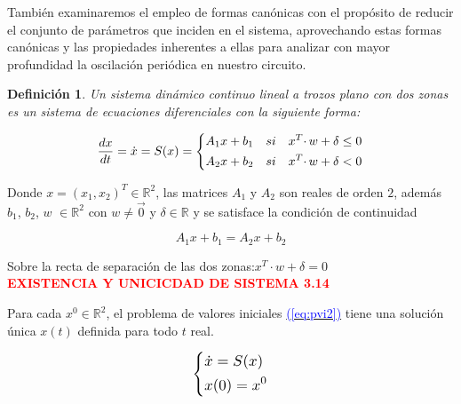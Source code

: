 \documentclass[12pt,a4paper]{report} %
\newtheorem{definicion}{Definición}[chapter]
\newtheorem{definicion}{Definición}[chapter] %
\newcommand{\eref}[1]{\hyperref[#1]{\textcolor{blue}{(\ref*{#1})}}}
\newcommand{\eref}[1]{\hyperref[#1]{\textcolor{blue}{\textit{(\ref*{#1})}}}}
\begin{document}
	\vspace{0.5cm}\noindent También examinaremos el empleo de formas canónicas con el propósito de reducir el conjunto de parámetros que inciden en el sistema, aprovechando estas formas canónicas y las propiedades inherentes a ellas para analizar con mayor profundidad la oscilación periódica en nuestro circuito.
	
	\begin{definicion}
		Un sistema dinámico continuo lineal a trozos plano con dos zonas es un sistema de ecuaciones diferenciales con la siguiente forma:
	\end{definicion}
	
	\begin{equation}
		\frac{dx}{dt}=\dot{x}=S(x)=
		\label{eq:biz1}
		\scalebox{1}{$\displaystyle
			\left\{
			\begin{aligned}
			 A_1x+b_1\quad si \quad x^T\cdotp w+\delta \leq 0 \\
			 A_2x+b_2\quad si \quad x^T\cdotp w+\delta < 0
			\end{aligned}
			\right.
			$}
	\end{equation}\smallskip
	
	\noindent Donde $x=(x_1,x_2)^T\in \mathbb{R}^2$, las matrices $A_1$ y $A_2$ son reales de orden $2$, además\\ $b_1$, $b_2$, $w$ $\in \mathbb{R}^2$ con $w\neq\vec{0}$ y $\delta \in \mathbb{R}$ y se satisface la condición de continuidad
	
	\begin{equation}
		A_1x+b_1=A_2x+b_2 
	\end{equation}\smallskip
	
	\noindent Sobre la recta de separación de las dos zonas:\quad $x^T\cdotp w+\delta = 0$ \\[0.5cm]
	
	\textbf{\textcolor{red}{EXISTENCIA Y UNICICDAD DE SISTEMA 3.14}}

	\noindent Para cada $x^0 \in \mathbb{R}^2$, el problema de valores iniciales \eref{eq:pvi2} tiene una solución única $x(t)$ definida para todo $t$ real.
	
	\begin{equation}
		\label{eq:pvi2}
		\scalebox{1.2}{$\displaystyle
			\left\{
			\begin{aligned}
				&\dot{x}=S(x)\\
				&x(0)=x^0
			\end{aligned}
			\right.
			$}
	\end{equation}\smallskip
	
\end{document}
